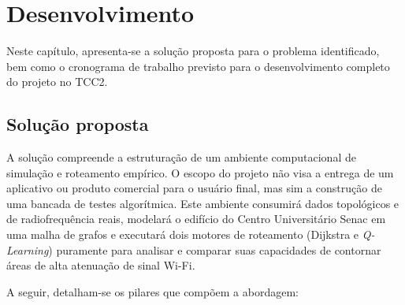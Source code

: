 \documentclass[
    12pt,                %
    openright,           %
    oneside,             %
    a4paper,             %
    english,             %
    brazil               %
]{abntex2}
\begin{document}
\chapter{Desenvolvimento}
\label{cap:desenvolvimento}

Neste capítulo, apresenta-se a solução proposta para o problema identificado, bem como o cronograma de trabalho previsto para o desenvolvimento completo do projeto no TCC2.

\section{Solução proposta}
\label{sec:solucao}

A solução compreende a estruturação de um ambiente computacional de simulação e roteamento empírico. O escopo do projeto não visa a entrega de um aplicativo ou produto comercial para o usuário final, mas sim a construção de uma bancada de testes algorítmica. Este ambiente consumirá dados topológicos e de radiofrequência reais, modelará o edifício do Centro Universitário Senac em uma malha de grafos e executará dois motores de roteamento (Dijkstra e \textit{Q-Learning}) puramente para analisar e comparar suas capacidades de contornar áreas de alta atenuação de sinal Wi-Fi.

A seguir, detalham-se os pilares que compõem a abordagem:
\end{document}
